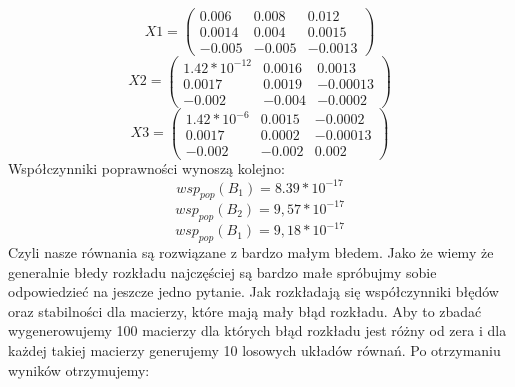 \documentclass{article}\usepackage{amsmath,amsfonts,amssymb}
\begin{document}
\begin{equation}
X1 =  
\begin{pmatrix}
  0.006 & 0.008 &  0.012 \\
  0.0014 & 0.004 &  0.0015 \\
  -0.005 & -0.005 & -0.0013 
 \end{pmatrix} 
\end{equation}
\begin{equation}
X2 =  
\begin{pmatrix}
  1.42 * 10^{-12} & 0.0016 &  0.0013 \\
  0.0017 & 0.0019 &  -0.00013\\
  -0.002 & -0.004 & -0.0002 
 \end{pmatrix} 
\end{equation}
\begin{equation}
X3 =  
\begin{pmatrix}
  1.42 * 10^{-6} & 0.0015 &  -0.0002 \\
  0.0017 & 0.0002 &  -0.00013\\
  -0.002 & -0.002 & 0.002 
 \end{pmatrix} 
\end{equation}
Współczynniki poprawności wynoszą kolejno:
\[ wsp_{pop}(B_1) = 8.39 * 10^{-17} \]
\[ wsp_{pop}(B_2) = 9,57 * 10^{-17} \]
\[ wsp_{pop}(B_1) = 9,18 * 10^{-17} \]
Czyli nasze równania są rozwiązane z bardzo małym błedem.
Jako że wiemy że generalnie błedy rozkładu najczęściej są bardzo małe spróbujmy sobie odpowiedzieć na jeszcze jedno pytanie. Jak rozkładają się współczynniki błędów oraz stabilności  dla macierzy, które mają mały błąd rozkładu.
Aby to zbadać wygenerowujemy 100 macierzy dla których błąd rozkładu jest różny od zera i dla każdej takiej macierzy generujemy 10 losowych układów równań. Po otrzymaniu wyników otrzymujemy:
\end{document}
